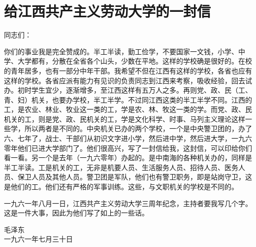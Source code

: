 \section[给江西共产主义劳动大学的一封信（一九六一年七月三十日）]{给江西共产主义劳动大学的一封信}

{\noindent 同志们：}

你们的事业我是完全赞成的。半工半读，勤工俭学，不要国家一文钱，小学、中学、大学都有，分散在全省各个山头，少数在平地。这样的学校确是很好的。在校的青年居多，也有一部分中年干部。我希望不但在江西有这样的学校，各省也应有这样的学校。各省应派有能力有见识的负责同志到江西来考察，吸收经验，回去试办。初时学生宜少，逐渐增多，至江西这样有五万人之多。再则党、政、民（工、青、妇）机关，也要办学校，半工半学。不过同江西这类的半工半学不同。江西的工，是农业、林业、牧业这一类的工，学是农、林、牧这一类的学。而党、政、民机关的工，则是党、政、民机关的工，学是文化科学、时事、马列主义理论这样一些学，所以两者是不同的。中央机关已办的两个学校，一个是中央警卫团的，办了六、七年了，战士、干部们从初识文字进小学，然后进中学，然后进大学，一九六零年他们已进大学部门了。他们很高兴，写了一封信给我，这封信，可以印给你们看一看。另一个是去年（一九六零年）办起的。是中南海的各种机关办的，同样是半工半读。工是机关的工，无非是机要人员、生活服务人员、招待人员、医务人员、保卫人员及其他人员。警卫团是军队，他们也有警卫职务，即是站岗守卫，这是他们的工。他们还有严格的军事训练。这些，与文职机关的学校是不同的。

一九六一年八月一日，江西共产主义劳动大学三周年纪念，主持者要我写几个字。这是一件大事，因此为他们写了如上的一些话。

{\raggedleft 毛泽东\\一九六一年七月三十日\par}


